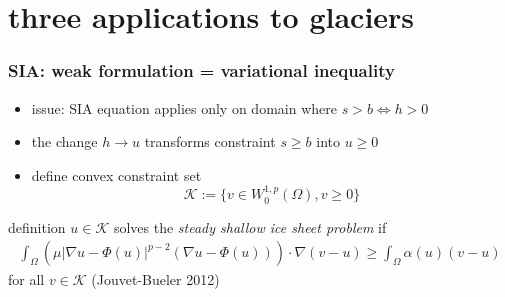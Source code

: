 \documentclass{beamer}
\newcommand{\Kcal}{\mathcal{K}}
\begin{document}
\section[glaciers]{three applications to glaciers}


\begin{frame}
  \frametitle{SIA: weak formulation = variational inequality} 

\begin{itemize}
\item issue: SIA equation applies only on domain where $s>b \iff h > 0$
\item the change $h \to u$ transforms  constraint $s \ge b$ into $u \ge 0$
\item define convex constraint set
  $$\Kcal := \{ v \in W^{1,p}_0 (\Omega), v \ge 0 \}$$
\end{itemize}

\begin{block}{definition} 
$u \in \Kcal$ solves the \emph{steady shallow ice sheet problem} if
\begin{align*}
\int_{\Omega}    \left( \mu  | \nabla u - \Phi(u) |^{p-2} 
( \nabla u - \Phi(u) )    \right)  \cdot \nabla ( v - u )  
\ge \int_{\Omega} \alpha(u) (  v -  u ) 
\end{align*}
for all $v \in \Kcal$ \hfill \scriptsize (Jouvet-Bueler 2012)
\end{block}
\end{frame}
\end{document}
